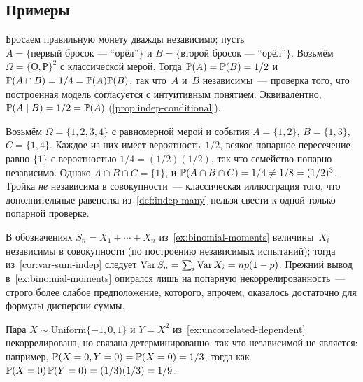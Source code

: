 \subsection*{Примеры}

\begin{example}
\label{ex:two-coins}
Бросаем правильную монету дважды независимо; пусть $A = \{\text{первый бросок~--- ``орёл''}\}$ и $B = \{\text{второй бросок~--- ``орёл''}\}$. Возьмём $\Omega = \{\text{О}, \text{Р}\}^2$ с классической мерой. Тогда $\mathbb{P}(A) = \mathbb{P}(B) = 1/2$ и $\mathbb{P}(A \cap B) = 1/4 = \mathbb{P}(A) \mathbb{P}(B)$, так что~$A$ и~$B$ независимы~--- проверка того, что построенная модель согласуется с интуитивным понятием. Эквивалентно, $\mathbb{P}(A \mid B) = 1/2 = \mathbb{P}(A)$ (\cref{prop:indep-conditional}).
\end{example}

\begin{example}
\label{ex:bernstein}
Возьмём $\Omega = \{1, 2, 3, 4\}$ с равномерной мерой и события $A = \{1, 2\}$, $B = \{1, 3\}$, $C = \{1, 4\}$. Каждое из них имеет вероятность~$1/2$, всякое попарное пересечение равно $\{1\}$ с вероятностью $1/4 = (1/2)(1/2)$, так что семейство попарно независимо. Однако $A \cap B \cap C = \{1\}$, и $\mathbb{P}(A \cap B \cap C) = 1/4 \neq 1/8 = (1/2)^3$. Тройка \emph{не} независима в совокупности~--- классическая иллюстрация того, что дополнительные равенства из~\cref{def:indep-many} нельзя свести к одной только попарной проверке.
\end{example}

\begin{example}
\label{ex:binomial-indep}
В обозначениях $S_n = X_1 + \cdots + X_n$ из~\cref{ex:binomial-moments} величины~$X_i$ независимы в совокупности (по построению независимых испытаний); тогда из~\cref{cor:var-sum-indep} следует $\operatorname{Var} S_n = \sum_i \operatorname{Var} X_i = n p(1 - p)$. Прежний вывод в~\cref{ex:binomial-moments} опирался лишь на попарную некоррелированность~--- строго более слабое предположение, которого, впрочем, оказалось достаточно для формулы дисперсии суммы.
\end{example}

\begin{example}
\label{ex:uncorrelated-not-indep}
Пара $X \sim \mathrm{Uniform}\{-1, 0, 1\}$ и $Y = X^2$ из~\cref{ex:uncorrelated-dependent} некоррелирована, но связана детерминированно, так что независимой не является: например, $\mathbb{P}(X = 0, Y = 0) = \mathbb{P}(X = 0) = 1/3$, тогда как $\mathbb{P}(X = 0)\, \mathbb{P}(Y = 0) = (1/3)(1/3) = 1/9$.
\end{example}

